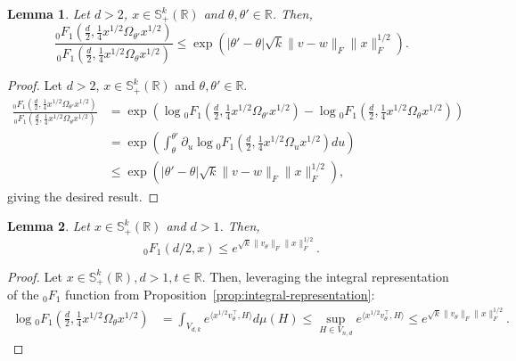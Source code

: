 \documentclass{article}
\theoremstyle{plain}
\newtheorem{lemma}{Lemma}[section]
\theoremstyle{definition}
\theoremstyle{remark}
\begin{document}
\begin{lemma}
\label{lem:upper-bound-ratio}
    Let $d > 2$, $x \in \mathbb{S}_+^k(\mathbb{R})$ and $\theta, \theta' \in \mathbb{R}$. Then,
    \[\frac{{}_0F_1\left(\frac{d}{2}, \frac{1}{4} x^{1/2} \Omega_{\theta'} x^{1/2}\right)}{{}_0F_1\left(\frac{d}{2}, \frac{1}{4}x^{1/2} \Omega_{\theta} x^{1/2}\right)} \leq \exp\left( |\theta'-\theta|\sqrt{k}\|v-w\|_{F} \|x\|_F^{1/2}\right) .\]
\end{lemma}

\begin{proof}
    Let $d > 2$, $x \in \mathbb{S}_+^k(\mathbb{R})$ and $\theta, \theta' \in \mathbb{R}$. 
    \begin{align*}
        \frac{{}_0F_1\left(\frac{d}{2}, \frac{1}{4} x^{1/2} \Omega_{\theta'} x^{1/2}\right)}{{}_0F_1\left(\frac{d}{2}, \frac{1}{4}x^{1/2} \Omega_{\theta} x^{1/2}\right)} &= \exp\left(\log {}_0F_1\left(\frac{d}{2}, \frac{1}{4} x^{1/2} \Omega_{\theta'} x^{1/2}\right) - \log {}_0F_1\left(\frac{d}{2}, \frac{1}{4} x^{1/2} \Omega_{\theta} x^{1/2}\right)\right)\\
        &= \exp\left( \int_{\theta}^{\theta'} \partial_u \log {}_0F_1\left(\frac{d}{2}, \frac{1}{4} x^{1/2} \Omega_{u} x^{1/2}\right) du \right)\\
        &\leq \exp\left( |\theta' - \theta|\sqrt{k}\|v-w\|_{F} \|x\|_F^{1/2} \right),
    \end{align*}
    giving the desired result.
\end{proof}

\begin{lemma}
\label{lem:hypergeometric-scaling}
    Let $x \in \mathbb{S}_+^k(\mathbb{R})$ and $ d > 1$. Then,
    \[{}_0F_1(d/2, x) \leq e^{\sqrt{k}\|v_\theta\|_F \|x\|_F^{1/2}}.\]
\end{lemma}
\begin{proof}
     Let $x \in \mathbb{S}_+^k(\mathbb{R}), d > 1, t \in \mathbb{R}$. Then, leveraging the integral representation of the ${}_0F_1$ function from Proposition~\ref{prop:integral-representation}:
    \begin{align*}
        \log {}_0F_1\left(\frac{d}{2}, \frac{1}{4}x^{1/2} \Omega_\theta x^{1/2}\right) &=  \int_{V_{d,k}} e^{\langle x^{1/2} v_\theta^\top, H\rangle} d\mu(H) \leq \sup_{H \in V_{n,d}} e^{\langle x^{1/2} v_\theta^\top, H\rangle} \leq  e^{\sqrt{k}\|v_\theta\|_F \|x\|_F^{1/2}}.
    \end{align*}
\end{proof}
\end{document}
